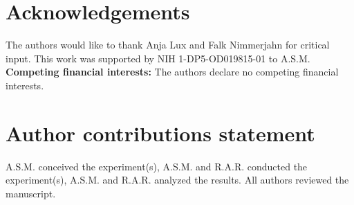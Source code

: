 \section*{Acknowledgements}

The authors would like to thank Anja Lux and Falk Nimmerjahn for critical input. This work was supported by NIH 1-DP5-OD019815-01 to A.S.M. \textbf{Competing financial interests:} The authors declare no competing financial interests.

\section*{Author contributions statement}

A.S.M. conceived the experiment(s),  A.S.M. and R.A.R. conducted the experiment(s), A.S.M. and R.A.R. analyzed the results.  All authors reviewed the manuscript. 